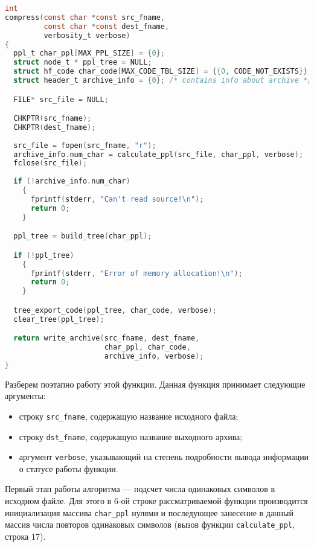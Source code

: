 \begin{lstlisting}[basicstyle=\scriptsize\ttfamily,
                   numberstyle=\scriptsize\ttfamily,
                   xleftmargin=7mm,
                   language=C,caption=Функция сжатия данных compress,
                   label=lst:compress]
int
compress(const char *const src_fname,
         const char *const dest_fname,
         verbosity_t verbose)
{
  ppl_t char_ppl[MAX_PPL_SIZE] = {0};
  struct node_t * ppl_tree = NULL; 
  struct hf_code char_code[MAX_CODE_TBL_SIZE] = {{0, CODE_NOT_EXISTS}};
  struct header_t archive_info = {0}; /* contains info about archive */

  FILE* src_file = NULL;

  CHKPTR(src_fname);
  CHKPTR(dest_fname);
  
  src_file = fopen(src_fname, "r");
  archive_info.num_char = calculate_ppl(src_file, char_ppl, verbose);
  fclose(src_file);
  
  if (!archive_info.num_char)
    {
      fprintf(stderr, "Can't read source!\n");
      return 0;
    }

  ppl_tree = build_tree(char_ppl);

  if (!ppl_tree)
    {
      fprintf(stderr, "Error of memory allocation!\n");
      return 0;
    }

  tree_export_code(ppl_tree, char_code, verbose);
  clear_tree(ppl_tree);

  return write_archive(src_fname, dest_fname,
                       char_ppl, char_code,
                       archive_info, verbose);
}
\end{lstlisting}

Разберем поэтапно работу этой функции. 
Данная функция принимает следующие аргументы:
\begin{itemize}
\item строку \texttt{src\_fname}, содержащую название исходного файла;
\item строку \texttt{dst\_fname}, содержащую название выходного архива;
\item аргумент \texttt{verbose}, указывающий на степень подробности вывода
  информации о статусе работы функции.
\end{itemize}

Первый этап работы алгоритма --- подсчет числа одинаковых символов 
в исходном файле. Для этого в 6-ой строке рассматриваемой функции производится
инициализация массива \texttt{char\_ppl} нулями и последующее занесение 
в данный массив числа повторов одинаковых символов
(вызов функции \texttt{calculate\_ppl}, строка 17).

